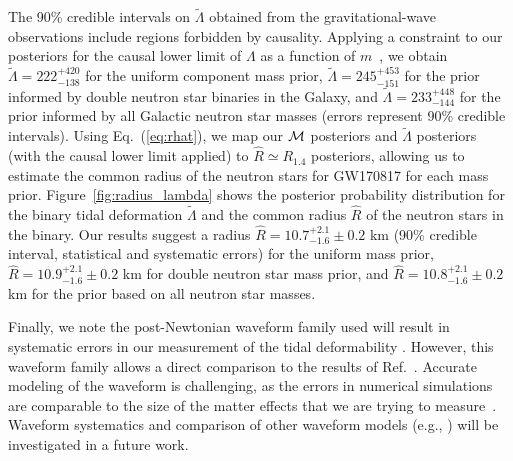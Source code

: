 The 90\% credible intervals on $\tilde{\Lambda}$ obtained from the gravitational-wave observations include regions forbidden by causality. Applying a constraint to our posteriors for the causal lower limit of $\Lambda$ as a function of $m$~\cite{Zhao:2018nyf}, we obtain $\tilde{\Lambda}=
222^{+420}_{-138}$ for the uniform component mass prior, $\tilde{\Lambda}=245^{+453}_{-151}$ for the prior informed by double neutron star binaries in the Galaxy, and $\tilde{\Lambda}=233^{+448}_{-144}$ for the prior informed by all Galactic neutron star masses (errors represent 90\% credible intervals). Using Eq.~(\ref{eq:rhat}), we map our $\cal{M}$ posteriors and $\tilde{\Lambda}$ posteriors (with the causal lower limit applied) to $\hat{R} \simeq R_{1.4}$ posteriors, allowing us to estimate the common radius of the neutron stars for GW170817 for each mass prior. Figure~\ref{fig:radius_lambda} shows the posterior probability distribution for the binary tidal deformation $\tilde\Lambda$ and the common radius $\hat{R}$ of the neutron stars in the binary. Our results suggest a radius $\hat R = 10.7^{+2.1}_{-1.6} \pm 0.2$ km (90\% credible interval, statistical and systematic errors) for the uniform mass prior,  $\hat R = 10.9^{+2.1}_{-1.6} \pm 0.2$ km for double neutron star mass prior, and $\hat R = 10.8^{+2.1}_{-1.6} \pm 0.2$ km for the prior based on all neutron star masses.


Finally, we note the post-Newtonian waveform family used will result in systematic errors in our measurement of the tidal deformability \cite{Wade:2014vqa,Lackey:2014fwa}. However, this waveform family allows a direct comparison to the results of Ref.~\cite{TheLIGOScientific:2017qsa}. Accurate modeling of the waveform is challenging, as the errors in numerical simulations are comparable to the size of the matter effects that we are trying to measure~\cite{Barkett:2015wia}. Waveform systematics and comparison of other waveform models (e.g., \cite{Bernuzzi:2014owa}) will be investigated in a future work.


